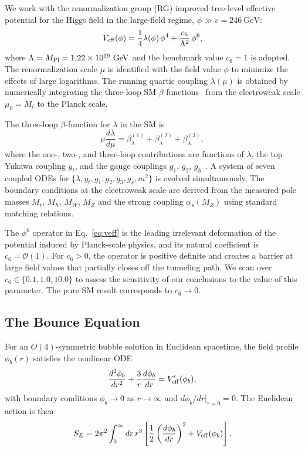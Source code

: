 \documentclass[aps,prd,twocolumn,superscriptaddress,nofootinbib]{revtex4-2}
\begin{document}
We work with the renormalization group (RG) improved tree-level effective
potential for the Higgs field in the large-field regime,
$\phi \gg v = 246~\text{GeV}$:
\begin{equation}
    V_{\rm eff}(\phi) = \frac{1}{4}\lambda(\phi)\,\phi^4
    + \frac{c_6}{\Lambda^2}\,\phi^6,
    \label{eq:veff}
\end{equation}
where $\Lambda = M_{\rm Pl} = 1.22 \times 10^{19}~\text{GeV}$ and the
benchmark value $c_6 = 1$ is adopted. The renormalization scale $\mu$ is
identified with the field value $\phi$ to minimize the effects of large
logarithms. The running quartic coupling $\lambda(\mu)$ is obtained by
numerically integrating the three-loop SM $\beta$-functions~\cite{Mihaila:2012pz}
from the electroweak scale $\mu_0 = M_t$ to the Planck scale.

The three-loop $\beta$-function for $\lambda$ in the SM is
\begin{equation}
    \mu \frac{d\lambda}{d\mu} = \beta_\lambda^{(1)} + \beta_\lambda^{(2)}
    + \beta_\lambda^{(3)},
    \label{eq:beta_lambda}
\end{equation}
where the one-, two-, and three-loop contributions are functions of
$\lambda$, the top Yukawa coupling $y_t$, and the gauge couplings $g_1$,
$g_2$, $g_3$~\cite{Luo:2002ti,Mihaila:2012pz}. A system of seven coupled
ODEs for $\{\lambda, y_t, g_1, g_2, g_3, g_s, m^2\}$ is evolved simultaneously.
The boundary conditions at the electroweak scale are derived from the
measured pole masses $M_t$, $M_h$, $M_W$, $M_Z$ and the strong coupling
$\alpha_s(M_Z)$ using standard matching relations.

The $\phi^6$ operator in Eq.~\eqref{eq:veff} is the leading irrelevant
deformation of the potential induced by Planck-scale physics, and its natural
coefficient is $c_6 = \mathcal{O}(1)$. For $c_6 > 0$, the operator is
positive definite and creates a barrier at large field values that partially
closes off the tunneling path. We scan over $c_6 \in \{0.1, 1.0, 10.0\}$ to
assess the sensitivity of our conclusions to the value of this parameter.
The pure SM result corresponds to $c_6 \to 0$.

\subsection{The Bounce Equation}
\label{subsec:bounce}

For an $O(4)$-symmetric bubble solution in Euclidean spacetime, the field
profile $\phi_b(r)$ satisfies the nonlinear ODE~\cite{Coleman:1977py}
\begin{equation}
    \frac{d^2\phi_b}{dr^2} + \frac{3}{r}\frac{d\phi_b}{dr} = V'_{\rm eff}(\phi_b),
    \label{eq:bounce_eom}
\end{equation}
with boundary conditions $\phi_b \to 0$ as $r \to \infty$ and
$d\phi_b/dr|_{r=0} = 0$. The Euclidean action is then
\begin{equation}
    S_E = 2\pi^2 \int_0^\infty dr\, r^3
    \left[\frac{1}{2}\left(\frac{d\phi_b}{dr}\right)^2 + V_{\rm eff}(\phi_b)\right].
    \label{eq:euclidean_action}
\end{equation}
\end{document}

